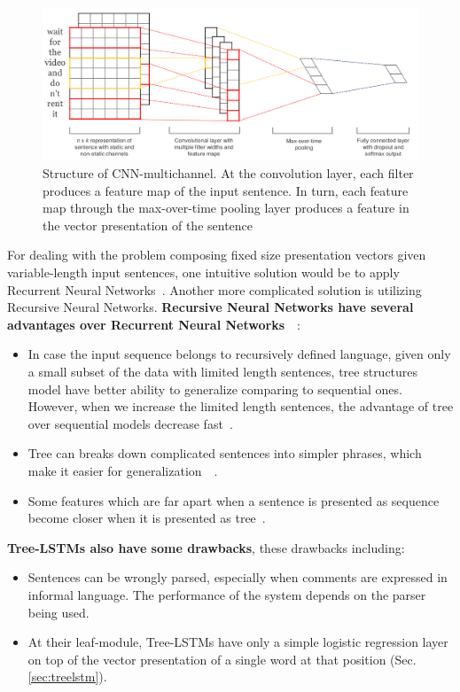 \begin{figure}[H]
    \centering
    \includegraphics[scale=0.33]{figure/sentencecnn}
    \caption[CNN-multichannel]{Structure of CNN-multichannel. 
    At the convolution layer, each filter produces a feature map of the input sentence. 
    In turn, each feature map through the max-over-time pooling layer produces a feature in the vector presentation of the sentence}
    \label{fig:CNN-multichannel}
\end{figure}

For dealing with the problem composing fixed size presentation vectors given variable-length input sentences, one intuitive solution would be to apply Recurrent Neural Networks~\cite{cnn-rnn}.
Another more complicated solution is utilizing Recursive Neural Networks.
\textbf{Recursive Neural Networks have several advantages over Recurrent Neural Networks}~\cite{need-tree}~\cite{bowman-treevslstm}: 
\begin{itemize}
\item In case the input sequence belongs to recursively defined language, given only a small subset of the data with limited length sentences, tree structures model have better ability to generalize comparing to sequential ones.
However, when we increase the limited length sentences, the advantage of tree over sequential models decrease fast~\cite{bowman-treevslstm}. 
\item Tree can breaks down complicated sentences into simpler phrases, which make it easier for generalization~\cite{knowledge-matter}~\cite{need-tree}.
\item Some features which are far apart when a sentence is presented as sequence become closer when it is presented as tree~\cite{need-tree}.
\end{itemize}

\textbf{Tree-LSTMs also have some drawbacks}, these drawbacks including:
\begin{itemize}
\item Sentences can be wrongly parsed, especially when comments are expressed in informal language.
The performance of the system depends on the parser being used.
\item At their leaf-module, Tree-LSTMs have only a simple logistic regression layer on top of the vector presentation of a single word at that position (Sec.\ref{sec:treelstm}). 
\end{itemize}

